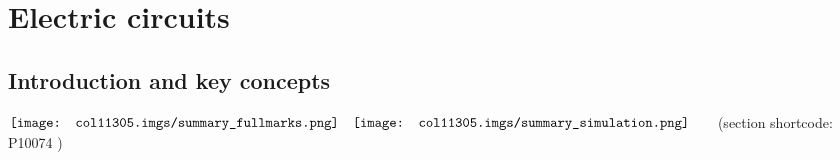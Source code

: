          \chapter{Electric circuits}

    \setcounter{figure}{1}
    \setcounter{subfigure}{1}
    \label{f13bac5321b85aca0e213ebdf4f72465}
         \section{ Introduction and key concepts}
    \nopagebreak
            \label{m38771} $ \hspace{-5pt}\begin{array}{cccccccccccc}   \texttt{[image: col11305.imgs/summary\_fullmarks.png]} &   \texttt{[image: col11305.imgs/summary\_simulation.png]} &   \end{array} $ \hspace{2 pt}\raisebox{-5 pt}{} {(section shortcode: P10074 )} \par 
    \label{m38771*cid2}
